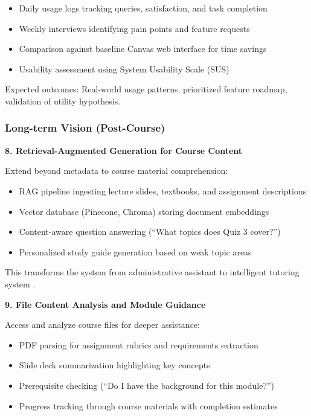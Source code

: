 \documentclass{article}
\begin{document}
\begin{itemize}
    \item Daily usage logs tracking queries, satisfaction, and task completion
    \item Weekly interviews identifying pain points and feature requests
    \item Comparison against baseline Canvas web interface for time savings
    \item Usability assessment using System Usability Scale (SUS) \cite{teachable2025agents}
\end{itemize}

Expected outcomes: Real-world usage patterns, prioritized feature roadmap, validation of utility hypothesis.

\subsubsection{Long-term Vision (Post-Course)}

\textbf{8. Retrieval-Augmented Generation for Course Content}

Extend beyond metadata to course material comprehension:

\begin{itemize}
    \item RAG pipeline ingesting lecture slides, textbooks, and assignment descriptions
    \item Vector database (Pinecone, Chroma) storing document embeddings
    \item Content-aware question answering (``What topics does Quiz 3 cover?'')
    \item Personalized study guide generation based on weak topic areas
\end{itemize}

This transforms the system from administrative assistant to intelligent tutoring system \cite{teachable2025agents, education2025agentic}.

\textbf{9. File Content Analysis and Module Guidance}

Access and analyze course files for deeper assistance:

\begin{itemize}
    \item PDF parsing for assignment rubrics and requirements extraction
    \item Slide deck summarization highlighting key concepts
    \item Prerequisite checking (``Do I have the background for this module?'')
    \item Progress tracking through course materials with completion estimates
\end{itemize}
\end{document}
